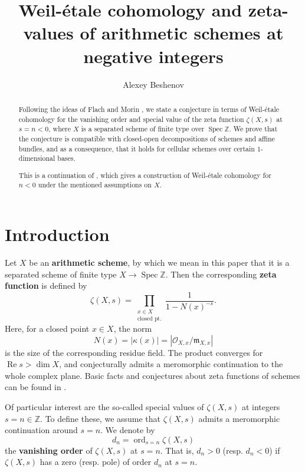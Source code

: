 \documentclass[10pt,a4paper,oneside,draft]{article}
\title{Weil-\'{e}tale cohomology and zeta-values of arithmetic schemes at
  negative integers}
\author{Alexey Beshenov}
\DeclareMathOperator{\ord}{ord}
\DeclareMathOperator{\Spec}{Spec}
\newcommand{\ZZ}{\mathbb{Z}}
\renewcommand{\Re}{\operatorname{Re}}
\theoremstyle{myplain}
\theoremstyle{mydefinition}
\numberwithin{equation}{section}
\begin{document}
\maketitle

\begin{abstract}
  Following the ideas of Flach and Morin \cite{Flach-Morin-2018}, we state a
  conjecture in terms of Weil-\'{e}tale cohomology for the vanishing order and
  special value of the zeta function $\zeta (X,s)$ at $s = n < 0$, where $X$ is
  a separated scheme of finite type over $\Spec \ZZ$. We prove that the
  conjecture is compatible with closed-open decompositions of schemes and affine
  bundles, and as a consequence, that it holds for cellular schemes over certain
  $1$-dimensional bases.

  This is a continuation of \cite{Beshenov-Weil-etale-1}, which gives a
  construction of Weil-\'{e}tale cohomology for $n<0$ under the mentioned
  assumptions on $X$.
\end{abstract}

\tableofcontents


\section{Introduction}

Let $X$ be an \textbf{arithmetic scheme}, by which we mean in this paper that it
is a separated scheme of finite type $X \to \Spec \ZZ$. Then the corresponding
\textbf{zeta function} is defined by
\begin{equation}
  \label{eqn:Euler-product-for-zeta}
  \zeta (X,s) = \prod_{\substack{x \in X \\ \text{closed pt.}}}
  \frac{1}{1 - N (x)^{-s}}.
\end{equation}
Here, for a closed point $x \in X$, the norm
$$N (x) = |\kappa (x)| = |\mathcal{O}_{X,x}/\mathfrak{m}_{X,x}|$$
is the size of the corresponding residue field. The product converges for
$\Re s > \dim X$, and conjecturally admits a meromorphic continuation to the
whole complex plane. Basic facts and conjectures about zeta functions of schemes
can be found in \cite{Serre-1965}.

Of particular interest are the so-called special values of $\zeta (X,s)$ at
integers $s = n \in \ZZ$. To define these, we assume that $\zeta (X,s)$ admits a
meromorphic continuation around $s = n$. We denote by
$$d_n = \ord_{s=n} \zeta (X,s)$$
the \textbf{vanishing order} of $\zeta (X,s)$ at $s = n$. That is, $d_n > 0$
(resp. $d_n < 0$) if $\zeta (X,s)$ has a zero (resp. pole) of order $d_n$ at
$s = n$.
\end{document}
